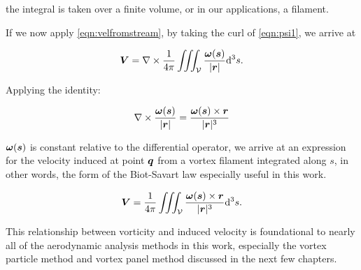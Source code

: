 \where the integral is taken over a finite volume, or in our applications, a filament.

If we now apply \cref{eqn:velfromstream}, by taking the curl of \cref{eqn:psi1}, we arrive at

\begin{equation}
        \bm{V} =\nabla \times \frac{1}{4\pi} \iiint_{\mathcal{V}} \frac{\bm{\omega}(\bm{s})}{|\bm{r}|} \mathrm{d}^3s.
\end{equation}

\noindent Applying the identity:

\begin{equation}
    \nabla \times \frac{\bm{\omega}(\bm{s})}{|\bm{r}|} = \frac{\bm{\omega}(\bm{s})\times \bm{r}}{|\bm{r}|^3}
\end{equation}

\where \(\bm{\omega}(\bm{s})\) is constant relative to the differential operator,
%
we arrive at an expression for the velocity induced at point \(\bm{q}\) from a vortex filament integrated along \(s\), in other words, the form of the Biot-Savart law especially useful in this work.

\begin{equation}
    \label{eqn:biotsavart}
        \bm{V} = \frac{1}{4\pi} \iiint_{\mathcal{V}} \frac{\bm{\omega}(\bm{s}) \times \bm{r}}{|\bm{r}|^3} \mathrm{d}^3s.
\end{equation}

\noindent This relationship between vorticity and induced velocity is foundational to nearly all of the aerodynamic analysis methods in this work, especially the vortex particle method and vortex panel method discussed in the next few chapters.






